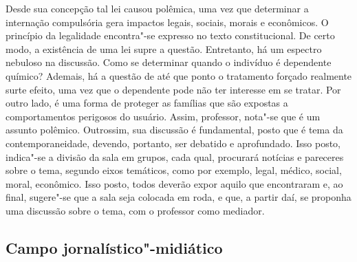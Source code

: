 \documentclass[12pt]{extarticle}
\begin{document}
Desde sua concepção tal lei causou polêmica, uma vez que determinar a
internação compulsória gera impactos legais, sociais, morais e
econômicos. O princípio da legalidade encontra"-se expresso no texto
constitucional. De certo modo, a existência de uma lei supre a questão.
Entretanto, há um espectro nebuloso na discussão. Como se determinar
quando o indivíduo é dependente químico? Ademais, há a questão de até
que ponto o tratamento forçado realmente surte efeito, uma vez que o
dependente pode não ter interesse em se tratar. Por outro lado, é uma
forma de proteger as famílias que são expostas a comportamentos
perigosos do usuário. Assim, professor, nota"-se que é um assunto
polêmico. Outrossim, sua discussão é fundamental, posto que é tema da
contemporaneidade, devendo, portanto, ser debatido e aprofundado. Isso
posto, indica"-se a divisão da sala em grupos, cada qual, procurará
notícias e pareceres sobre o tema, segundo eixos temáticos, como por
exemplo, legal, médico, social, moral, econômico. Isso posto, todos
deverão expor aquilo que encontraram e, ao final, sugere"-se que a sala
seja colocada em roda, e que, a partir daí, se proponha uma discussão
sobre o tema, com o professor como mediador.

\subsection{Campo jornalístico"-midiático}


\end{document}
